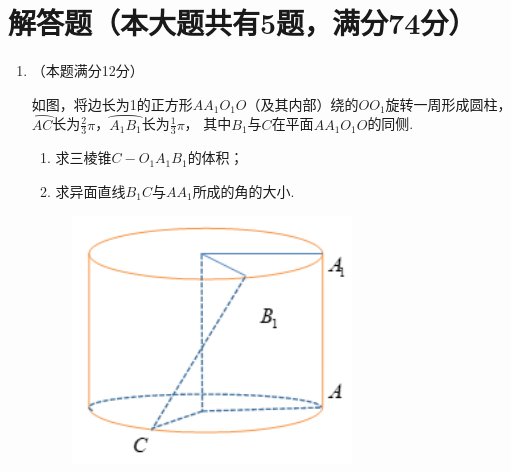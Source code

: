 \documentclass[12pt,space]{ctexart} %
\begin{document}
\section{解答题（本大题共有5题，满分74分）}
\begin{enumerate}[itemsep=-0.3em,topsep=0pt, resume]

  \item （本题满分12分）\\[0.5em] 
    \begin{minipage}[h][18ex][t]{.63\textwidth}
      如图，将边长为1的正方形$AA_1O_1O$（及其内部）绕的$OO_1$旋转一周形成圆柱，$\wideparen{AC}$长为$\displaystyle{\frac 23\pi}$，$\wideparen{A_1B_1}$长为$\displaystyle{\frac 13\pi}$，
      其中$B_1$与$C$在平面$AA_1O_1O$的同侧. 
      \begin{enumerate}[itemsep=-0.3em,label={(\arabic*)},topsep=0pt,labelsep=.5em,leftmargin=1.7em]
        \item 求三棱锥$C-O_1A_1B_1$的体积；
        \item 求异面直线$B_1C$与$AA_1$所成的角的大小. 
      \end{enumerate}
    \end{minipage}
    \begin{minipage}[h][18ex][b]{.35\textwidth}
      \begin{figure}[H]
        \centering
        \includegraphics[width=0.7\textwidth]{Image/sh-19.png}
      \end{figure}
    \end{minipage}


\end{enumerate}
\end{document}
